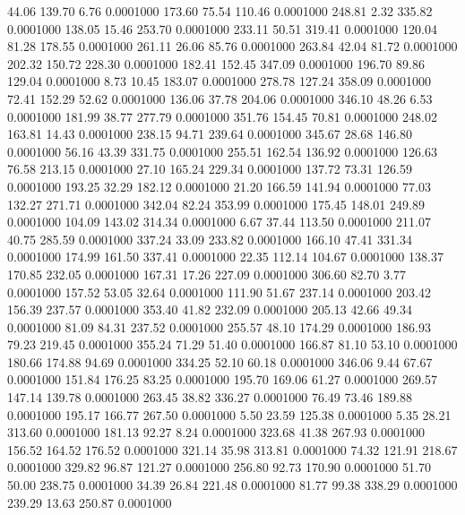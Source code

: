   44.06  139.70    6.76   0.0001000
 173.60   75.54  110.46   0.0001000
 248.81    2.32  335.82   0.0001000
 138.05   15.46  253.70   0.0001000
 233.11   50.51  319.41   0.0001000
 120.04   81.28  178.55   0.0001000
 261.11   26.06   85.76   0.0001000
 263.84   42.04   81.72   0.0001000
 202.32  150.72  228.30   0.0001000
 182.41  152.45  347.09   0.0001000
 196.70   89.86  129.04   0.0001000
   8.73   10.45  183.07   0.0001000
 278.78  127.24  358.09   0.0001000
  72.41  152.29   52.62   0.0001000
 136.06   37.78  204.06   0.0001000
 346.10   48.26    6.53   0.0001000
 181.99   38.77  277.79   0.0001000
 351.76  154.45   70.81   0.0001000
 248.02  163.81   14.43   0.0001000
 238.15   94.71  239.64   0.0001000
 345.67   28.68  146.80   0.0001000
  56.16   43.39  331.75   0.0001000
 255.51  162.54  136.92   0.0001000
 126.63   76.58  213.15   0.0001000
  27.10  165.24  229.34   0.0001000
 137.72   73.31  126.59   0.0001000
 193.25   32.29  182.12   0.0001000
  21.20  166.59  141.94   0.0001000
  77.03  132.27  271.71   0.0001000
 342.04   82.24  353.99   0.0001000
 175.45  148.01  249.89   0.0001000
 104.09  143.02  314.34   0.0001000
   6.67   37.44  113.50   0.0001000
 211.07   40.75  285.59   0.0001000
 337.24   33.09  233.82   0.0001000
 166.10   47.41  331.34   0.0001000
 174.99  161.50  337.41   0.0001000
  22.35  112.14  104.67   0.0001000
 138.37  170.85  232.05   0.0001000
 167.31   17.26  227.09   0.0001000
 306.60   82.70    3.77   0.0001000
 157.52   53.05   32.64   0.0001000
 111.90   51.67  237.14   0.0001000
 203.42  156.39  237.57   0.0001000
 353.40   41.82  232.09   0.0001000
 205.13   42.66   49.34   0.0001000
  81.09   84.31  237.52   0.0001000
 255.57   48.10  174.29   0.0001000
 186.93   79.23  219.45   0.0001000
 355.24   71.29   51.40   0.0001000
 166.87   81.10   53.10   0.0001000
 180.66  174.88   94.69   0.0001000
 334.25   52.10   60.18   0.0001000
 346.06    9.44   67.67   0.0001000
 151.84  176.25   83.25   0.0001000
 195.70  169.06   61.27   0.0001000
 269.57  147.14  139.78   0.0001000
 263.45   38.82  336.27   0.0001000
  76.49   73.46  189.88   0.0001000
 195.17  166.77  267.50   0.0001000
   5.50   23.59  125.38   0.0001000
   5.35   28.21  313.60   0.0001000
 181.13   92.27    8.24   0.0001000
 323.68   41.38  267.93   0.0001000
 156.52  164.52  176.52   0.0001000
 321.14   35.98  313.81   0.0001000
  74.32  121.91  218.67   0.0001000
 329.82   96.87  121.27   0.0001000
 256.80   92.73  170.90   0.0001000
  51.70   50.00  238.75   0.0001000
  34.39   26.84  221.48   0.0001000
  81.77   99.38  338.29   0.0001000
 239.29   13.63  250.87   0.0001000
